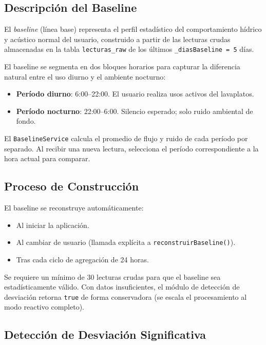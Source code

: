 \documentclass[12pt,a4paper]{article}
\begin{document}
\subsection{Descripción del Baseline}

El \textit{baseline} (línea base) representa el perfil estadístico del comportamiento hídrico y acústico normal del usuario, construido a partir de las lecturas crudas almacenadas en la tabla \texttt{lecturas\_raw} de los últimos \texttt{\_diasBaseline = 5} días.

El baseline se segmenta en dos bloques horarios para capturar la diferencia natural entre el uso diurno y el ambiente nocturno:

\begin{itemize}[noitemsep]
    \item \textbf{Período diurno}: 6:00--22:00. El usuario realiza usos activos del lavaplatos.
    \item \textbf{Período nocturno}: 22:00--6:00. Silencio esperado; solo ruido ambiental de fondo.
\end{itemize}

El \texttt{BaselineService} calcula el promedio de flujo y ruido de cada período por separado. Al recibir una nueva lectura, selecciona el período correspondiente a la hora actual para comparar.

\subsection{Proceso de Construcción}

El baseline se reconstruye automáticamente:
\begin{itemize}[noitemsep]
    \item Al iniciar la aplicación.
    \item Al cambiar de usuario (llamada explícita a \texttt{reconstruirBaseline()}).
    \item Tras cada ciclo de agregación de 24 horas.
\end{itemize}

Se requiere un mínimo de 30 lecturas crudas para que el baseline sea estadísticamente válido. Con datos insuficientes, el módulo de detección de desviación retorna \texttt{true} de forma conservadora (se escala el procesamiento al modo reactivo completo).

\subsection{Detección de Desviación Significativa}
\end{document}
